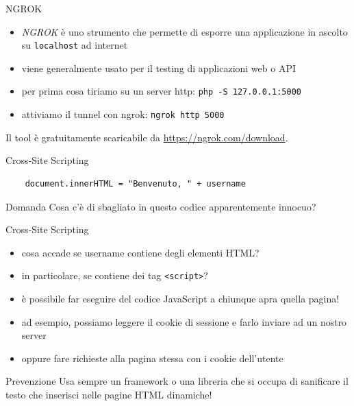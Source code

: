 \documentclass[12pt,handout]{beamer}
\begin{document}
\begin{frame}{NGROK}
    \begin{itemize}
        \item \textit{NGROK} è uno strumento che permette di esporre una applicazione in ascolto su \texttt{localhost} ad internet
        \item viene generalmente usato per il testing di applicazioni web o API
        \item per prima cosa tiriamo su un server http: \texttt{php -S 127.0.0.1:5000}
        \item attiviamo il tunnel con ngrok: \texttt{ngrok http 5000}
    \end{itemize}
    \vfill
    Il tool è gratuitamente scaricabile da 
    \url{https://ngrok.com/download}.
\end{frame}

\begin{frame}[fragile]{Cross-Site Scripting}
\begin{verbatim}
    document.innerHTML = "Benvenuto, " + username
\end{verbatim}
\vfill
\begin{exampleblock}{Domanda}
Cosa c'è di sbagliato in questo codice apparentemente innocuo?
\end{exampleblock}
\end{frame}

\begin{frame}{Cross-Site Scripting}
\begin{itemize}
\item cosa accade se username contiene degli elementi HTML?
\pause
\item in particolare, se contiene dei tag \texttt{<script>}?
\pause
\item è possibile far eseguire del codice JavaScript a chiunque apra quella pagina!
\pause
\item ad esempio, possiamo leggere il cookie di sessione e farlo inviare ad un nostro server
\pause
\item oppure fare richieste alla pagina stessa con i cookie dell'utente
\end{itemize}
\pause
\vfill
\begin{alertblock}{Prevenzione}
Usa sempre un framework o una libreria che si occupa di sanificare il testo che inserisci nelle pagine HTML dinamiche!
\end{alertblock}
\end{frame}
\end{document}
